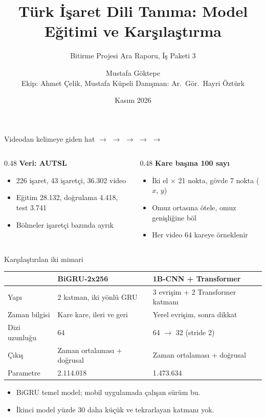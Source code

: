\documentclass[aspectratio=169,11pt]{beamer}
\title{Türk İşaret Dili Tanıma: Model Eğitimi ve Karşılaştırma}
\subtitle{Bitirme Projesi Ara Raporu, İş Paketi 3}
\author{Mustafa Göktepe \\[1mm] {\small Ekip: Ahmet Çelik, Mustafa Küpeli \quad Danışman: Ar.\ Gör.\ Hayri Öztürk}}
\institute{Erciyes Üniversitesi, Bilgisayar Mühendisliği}
\date{Kasım 2026}
\begin{document}
\begin{frame}[plain]
\titlepage
\end{frame}

\begin{frame}{Videodan kelimeye giden hat}
\centering
\footnotesize
\setlength{\fboxsep}{4pt}
 $\rightarrow$
 $\rightarrow$
 $\rightarrow$
 $\rightarrow$
 $\rightarrow$

\vspace{6mm}
\normalsize
\begin{columns}[T]
\begin{column}{0.48\textwidth}
\textbf{Veri: AUTSL}
\begin{itemize}
\item 226 işaret, 43 işaretçi, 36.302 video
\item Eğitim 28.132, doğrulama 4.418, test 3.741
\item Bölmeler işaretçi bazında ayrık
\end{itemize}
\end{column}
\begin{column}{0.48\textwidth}
\textbf{Kare başına 100 sayı}
\begin{itemize}
\item İki el $\times$ 21 nokta, gövde 7 nokta ($x$, $y$)
\item Omuz ortasına ötele, omuz genişliğine böl
\item Her video 64 kareye örneklenir
\end{itemize}
\end{column}
\end{columns}
\end{frame}

\begin{frame}{Karşılaştırılan iki mimari}
\centering
\begin{tabular}{@{}lll@{}}
\toprule
 & \textbf{BiGRU-2x256} & \textbf{1B-CNN + Transformer} \\
\midrule
Yapı & 2 katman, iki yönlü GRU & 3 evrişim + 2 Transformer katmanı \\
Zaman bilgisi & Kare kare, ileri ve geri & Yerel evrişim, sonra dikkat \\
Dizi uzunluğu & 64 & 64 $\rightarrow$ 32 (stride 2) \\
Çıkış & Zaman ortalaması + doğrusal & Zaman ortalaması + doğrusal \\
Parametre & 2.114.018 & 1.473.634 \\
\bottomrule
\end{tabular}

\vspace{6mm}
\begin{itemize}
\item BiGRU temel model; mobil uygulamada çalışan sürüm bu.
\item İkinci model yüzde 30 daha küçük ve tekrarlayan katmanı yok.
\end{itemize}
\end{frame}
\end{document}
